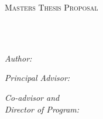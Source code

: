 \documentclass[
11pt, 
english,
singlespacing,
parskip,
headsepline,
]{MastersDoctoralThesis}
\author{Antonio Osamu \textsc{Katagiri} Tanaka}
\begin{document}
\frontmatter

\pagestyle{plain} 


\begin{titlepage}
\begin{center}

\vspace*{.06\textheight}
{\scshape\LARGE \univname\par}\vspace{1.5cm} %
\textsc{\Large Masters Thesis Proposal}\\[0.5cm]      %

\HRule \\[0.4cm]                            %
{\huge \bfseries \ttitle\par}\vspace{0.4cm} %
\HRule \\[1.5cm]                            %
 
\begin{minipage}[t]{0.4\textwidth}
\begin{flushleft} \large
\emph{Author:}\\

\href{https://linkedin.com/in/osamu-katagiri-84b2b940/}{\authorname}
\end{flushleft}
\end{minipage}
\begin{minipage}[t]{0.4\textwidth}
\begin{flushright} \large
\emph{Principal Advisor:} \\
\supname

\bigskip

\emph{Co-advisor and\\Director of Program:} \\
\href{https://www.medinadora.com/}{\cosupname}
\end{flushright}
\end{minipage}\\[3cm]
 

\end{center}
\end{titlepage}
\end{document}
